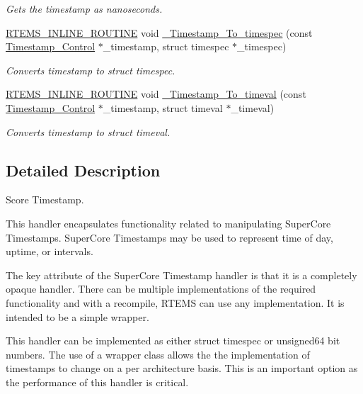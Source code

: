 \begin{DoxyCompactItemize}
\begin{DoxyCompactList}\small\item\em Gets the timestamp as nanoseconds. \end{DoxyCompactList}\item 
\mbox{\hyperlink{group__RTEMSScoreBaseDefs_gac216239df231d5dbd15e3520b0b9313f}{R\+T\+E\+M\+S\+\_\+\+I\+N\+L\+I\+N\+E\+\_\+\+R\+O\+U\+T\+I\+NE}} void \mbox{\hyperlink{group__SuperCoreTimeStamp_ga7130b0562e83d1d3e19c9ba55e4e2e0d}{\+\_\+\+Timestamp\+\_\+\+To\+\_\+timespec}} (const \mbox{\hyperlink{group__SuperCoreTimeStamp_ga8508036506d5211c98844c88045e2410}{Timestamp\+\_\+\+Control}} $\ast$\+\_\+timestamp, struct timespec $\ast$\+\_\+timespec)
\begin{DoxyCompactList}\small\item\em Converts timestamp to struct timespec. \end{DoxyCompactList}\item 
\mbox{\hyperlink{group__RTEMSScoreBaseDefs_gac216239df231d5dbd15e3520b0b9313f}{R\+T\+E\+M\+S\+\_\+\+I\+N\+L\+I\+N\+E\+\_\+\+R\+O\+U\+T\+I\+NE}} void \mbox{\hyperlink{group__SuperCoreTimeStamp_gadb33dc70061c5b46fabd9f8cc31828de}{\+\_\+\+Timestamp\+\_\+\+To\+\_\+timeval}} (const \mbox{\hyperlink{group__SuperCoreTimeStamp_ga8508036506d5211c98844c88045e2410}{Timestamp\+\_\+\+Control}} $\ast$\+\_\+timestamp, struct timeval $\ast$\+\_\+timeval)
\begin{DoxyCompactList}\small\item\em Converts timestamp to struct timeval. \end{DoxyCompactList}\end{DoxyCompactItemize}


\subsection{Detailed Description}
Score Timestamp. 

This handler encapsulates functionality related to manipulating Super\+Core Timestamps. Super\+Core Timestamps may be used to represent time of day, uptime, or intervals.

The key attribute of the Super\+Core Timestamp handler is that it is a completely opaque handler. There can be multiple implementations of the required functionality and with a recompile, R\+T\+E\+MS can use any implementation. It is intended to be a simple wrapper.

This handler can be implemented as either struct timespec or unsigned64 bit numbers. The use of a wrapper class allows the the implementation of timestamps to change on a per architecture basis. This is an important option as the performance of this handler is critical. 

